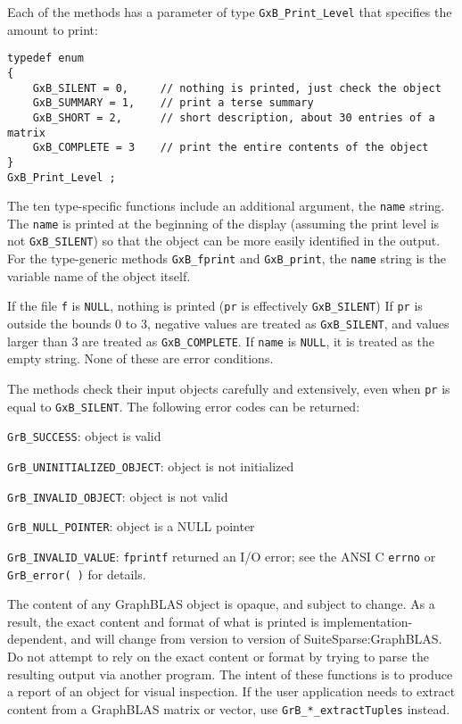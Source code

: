 \documentclass[12pt]{article}
\newenvironment{packed_itemize}{
\begin{itemize}
  \setlength{\itemsep}{1pt}
  \setlength{\parskip}{0pt}
  \setlength{\parsep}{0pt}
}{\end{itemize}}
\begin{document}
\newpage
Each of the methods has a parameter of type \verb'GxB_Print_Level' that
specifies the amount to print:

{\footnotesize
\begin{verbatim}
typedef enum
{
    GxB_SILENT = 0,     // nothing is printed, just check the object
    GxB_SUMMARY = 1,    // print a terse summary
    GxB_SHORT = 2,      // short description, about 30 entries of a matrix
    GxB_COMPLETE = 3    // print the entire contents of the object
}
GxB_Print_Level ; \end{verbatim}}

The ten type-specific functions include an additional argument, the
\verb'name' string.  The \verb'name' is printed at the beginning of the display
(assuming the print level is not \verb'GxB_SILENT') so that the object can be
more easily identified in the output.  For the type-generic methods
\verb'GxB_fprint' and \verb'GxB_print', the \verb'name' string is the variable
name of the object itself.

If the file \verb'f' is \verb'NULL', nothing is printed (\verb'pr' is
effectively \verb'GxB_SILENT') If \verb'pr' is outside the bounds 0 to 3,
negative values are treated as \verb'GxB_SILENT', and values larger than 3 are
treated as \verb'GxB_COMPLETE'.  If \verb'name' is \verb'NULL', it is treated
as the empty string.  None of these are error conditions.

The methods check their input objects carefully and extensively, even when
\verb'pr' is equal to \verb'GxB_SILENT'.  The following error codes can be
returned:

\begin{packed_itemize}
\item \verb'GrB_SUCCESS':               object is valid
\item \verb'GrB_UNINITIALIZED_OBJECT':  object is not initialized
\item \verb'GrB_INVALID_OBJECT':        object is not valid
\item \verb'GrB_NULL_POINTER':          object is a NULL pointer
\item \verb'GrB_INVALID_VALUE':         \verb'fprintf' returned an I/O error;
    see the ANSI C \verb'errno' or \verb'GrB_error( )' for details.
\end{packed_itemize}

The content of any GraphBLAS object is opaque, and subject to change.  As a
result, the exact content and format of what is printed is
implementation-dependent, and will change from version to version of
SuiteSparse:GraphBLAS.  Do not attempt to rely on the exact content or format
by trying to parse the resulting output via another program.  The intent of
these functions is to produce a report of an object for visual inspection.  If
the user application needs to extract content from a GraphBLAS matrix or
vector, use \verb'GrB_*_extractTuples' instead.
\end{document}
